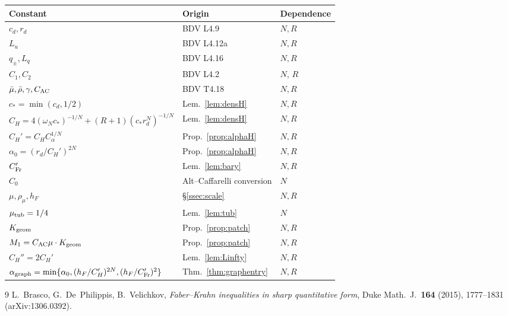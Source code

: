 \documentclass[11pt]{article}
\theoremstyle{definition}
\theoremstyle{remark}
\begin{document}
\begin{center}
\renewcommand{\arraystretch}{1.15}
\begin{tabular}{@{}lll@{}}
\toprule
Constant & Origin & Dependence \\
\midrule
$c_d,r_d$ & BDV L4.9 & $N,R$ \\
$L_u$ & BDV L4.12a & $N,R$ \\
$q_\pm,L_q$ & BDV L4.16 & $N,R$ \\
$C_1,C_2$ & BDV L4.2 & $N$, $R$ \\
$\bar\mu,\bar\rho,\gamma,C_{\rm AC}$ & BDV T4.18 & $N,R$ \\
$c_*=\min(c_d,1/2)$ & Lem.~\ref{lem:densH} & $N,R$ \\
$C_H=4(\omega_N c_*)^{-1/N}+(R+1)(c_*r_d^N)^{-1/N}$
& Lem.~\ref{lem:densH} & $N,R$ \\
$C_H'=C_H C_\alpha^{1/N}$ & Prop.~\ref{prop:alphaH} & $N,R$ \\
$\alpha_0=(r_d/C_H')^{2N}$ & Prop.~\ref{prop:alphaH} & $N,R$ \\
$C_{\rm Fr}'$ & Lem.~\ref{lem:bary} & $N,R$ \\
$C_0$ & Alt--Caffarelli conversion & $N$ \\
$\mu,\rho_\mu,h_F$ & \S\ref{ssec:scale} & $N,R$ \\
$\mu_{\rm tub}=1/4$ & Lem.~\ref{lem:tub} & $N$ \\
$K_{\rm geom}$ & Prop.~\ref{prop:patch} & $N,R$ \\
$M_1=C_{\rm AC}\mu\cdot K_{\rm geom}$ & Prop.~\ref{prop:patch} & $N,R$ \\
$C_H''=2C_H'$ & Lem.~\ref{lem:Linfty} & $N,R$ \\
$\alpha_{\rm graph}=\min\{\alpha_0,(h_F/C_H')^{2N},(h_F/C_{\rm Fr}')^2\}$
& Thm.~\ref{thm:graphentry} & $N,R$ \\
\bottomrule
\end{tabular}
\end{center}

\begin{thebibliography}{9}
 L.~Brasco, G.~De~Philippis, B.~Velichkov,
\emph{Faber--Krahn inequalities in sharp quantitative form},
Duke Math.\ J.\ \textbf{164} (2015), 1777--1831 (arXiv:1306.0392).
\end{thebibliography}
\end{document}
